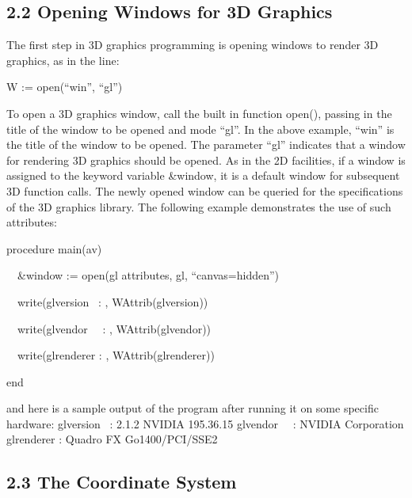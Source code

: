 \documentclass[letterpaper]{article}
\begin{document}
\subsection[2.2 Opening Windows for 3D Graphics]
{2.2 Opening Windows for 3D Graphics}


The first step in 3D graphics programming is opening windows to render
3D graphics, as in the line:

{\sffamily
W := open(``win'', ``gl'')}


\bigskip

To open a 3D graphics window, call the built in function
\textsf{open()}, passing in the title of the window to be
opened and mode \textsf{``gl''}. In the above example,
\textsf{``win''} is the title of the window to be opened. The
parameter \textsf{``gl''} indicates that a window for rendering 3D
graphics should be opened. As in the 2D facilities, if a window is
assigned to the keyword variable \textsf{\&window}, it is a default
window for subsequent 3D function calls. The newly opened window can
be queried for the specifications of the 3D graphics library. The
following example demonstrates the use of such attributes:

\textsf{procedure main(av)}

\textsf{ \ \ \&window := open({\textquotedbl}gl attributes{\textquotedbl}, {\textquotedbl}gl{\textquotedbl},
``canvas=hidden'')}

\textsf{ \ \ write({\textquotedbl}glversion \ : {\textquotedbl},
 WAttrib({\textquotedbl}glversion{\textquotedbl}))}

\textsf{ \ \ write({\textquotedbl}glvendor \ \ : {\textquotedbl},
 WAttrib({\textquotedbl}glvendor{\textquotedbl}))}

\textsf{ \ \ write({\textquotedbl}glrenderer : {\textquotedbl},
 WAttrib({\textquotedbl}glrenderer{\textquotedbl}))}

\textsf{end}

\noindent
and here is a sample output of the program after running it on
some specific hardware:\newline
\newline
\textsf{glversion \ : 2.1.2 NVIDIA 195.36.15\newline
glvendor \ \ : NVIDIA Corporation\newline
glrenderer : Quadro FX Go1400/PCI/SSE2}\newline


\subsection[2.3 The Coordinate System]{2.3 The Coordinate System}
\end{document}
